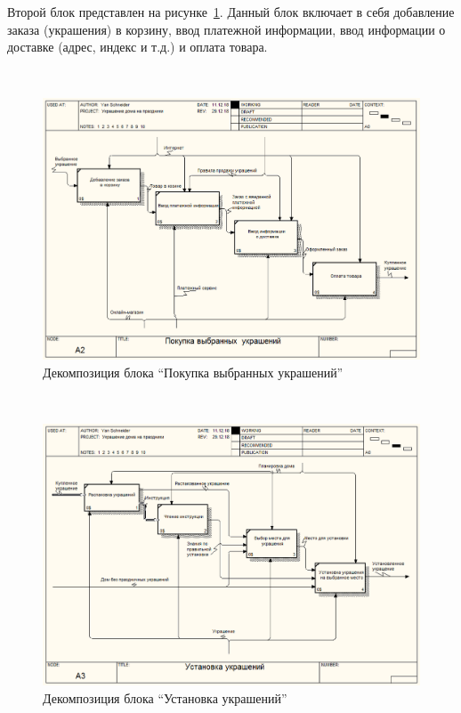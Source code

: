 Второй блок представлен на рисунке~\ref{fig:develop:functionalModel:a2_buy}. Данный блок включает в себя добавление заказа (украшения) в корзину, ввод платежной информации, ввод информации о доставке (адрес, индекс и т.д.) и оплата товара.

 ~
\begin{figure}[H]
\centering
	\includegraphics[scale=0.45]{figures/functionalModel/a2_buy.jpg}
	\caption{Декомпозиция блока ``Покупка выбранных украшений''}
	\label{fig:develop:functionalModel:a2_buy}
\end{figure}

 ~
\begin{figure}[H]
\centering
	\includegraphics[scale=0.45]{figures/functionalModel/a3_install.jpg}
	\caption{Декомпозиция блока ``Установка украшений''}
	\label{fig:develop:functionalModel:a3_install}
\end{figure}

